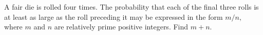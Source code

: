 A fair die is rolled four times.  The probability that each of the final three rolls is at least as large as the roll preceding it may be expressed in the form $m/n,$ where $m$ and $n$ are relatively prime positive integers.  Find $m+n.$